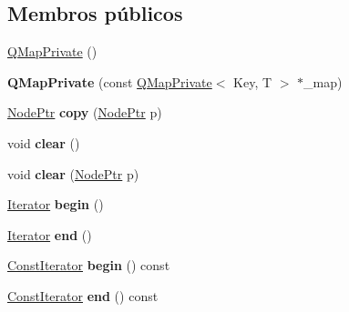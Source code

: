 \subsection*{Membros públicos}
\begin{DoxyCompactItemize}
\item 
\hyperlink{class_q_map_private_a353e0d43d4aef425011cd69fa647e7dd}{Q\-Map\-Private} ()
\item 
\hypertarget{class_q_map_private_a9355b186e46cb97f8c599cc3c2d66708}{{\bfseries Q\-Map\-Private} (const \hyperlink{class_q_map_private}{Q\-Map\-Private}$<$ Key, T $>$ $\ast$\-\_\-map)}\label{class_q_map_private_a9355b186e46cb97f8c599cc3c2d66708}

\item 
\hypertarget{class_q_map_private_a989fdb09aa8de40613b011ded7d187c6}{\hyperlink{struct_q_map_node}{Node\-Ptr} {\bfseries copy} (\hyperlink{struct_q_map_node}{Node\-Ptr} p)}\label{class_q_map_private_a989fdb09aa8de40613b011ded7d187c6}

\item 
\hypertarget{class_q_map_private_ac8bb3912a3ce86b15842e79d0b421204}{void {\bfseries clear} ()}\label{class_q_map_private_ac8bb3912a3ce86b15842e79d0b421204}

\item 
\hypertarget{class_q_map_private_a75b2fb9cd863bb037dd56a138fe1dd9d}{void {\bfseries clear} (\hyperlink{struct_q_map_node}{Node\-Ptr} p)}\label{class_q_map_private_a75b2fb9cd863bb037dd56a138fe1dd9d}

\item 
\hypertarget{class_q_map_private_a2387033802383edbdc95f9bbb12a707e}{\hyperlink{class_q_map_private_a8037b7e85b3b6dc9ae44eccdf67eccb6}{Iterator} {\bfseries begin} ()}\label{class_q_map_private_a2387033802383edbdc95f9bbb12a707e}

\item 
\hypertarget{class_q_map_private_ab45dae688fc5d8983727abffa4389003}{\hyperlink{class_q_map_private_a8037b7e85b3b6dc9ae44eccdf67eccb6}{Iterator} {\bfseries end} ()}\label{class_q_map_private_ab45dae688fc5d8983727abffa4389003}

\item 
\hypertarget{class_q_map_private_aeb8a08dab209e7d8bd94ea796e8055e7}{\hyperlink{class_q_map_const_iterator}{Const\-Iterator} {\bfseries begin} () const }\label{class_q_map_private_aeb8a08dab209e7d8bd94ea796e8055e7}

\item 
\hypertarget{class_q_map_private_afd94c820b193c151ddbaae99185a24f4}{\hyperlink{class_q_map_const_iterator}{Const\-Iterator} {\bfseries end} () const }\label{class_q_map_private_afd94c820b193c151ddbaae99185a24f4}


\end{DoxyCompactItemize}
